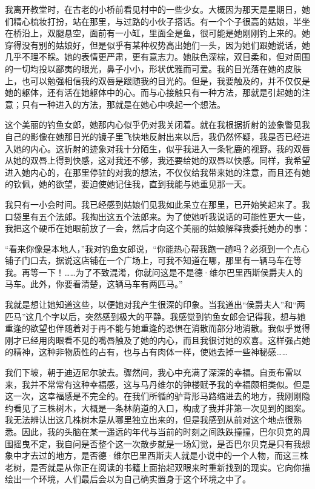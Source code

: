 \par 我离开教堂时，在古老的小桥前看见村中的一些少女。大概因为那天是星期日，她们精心梳妆打扮，站在那里，与过路的小伙子搭话。有一个个子很高的姑娘，半坐在桥沿上，双腿悬空，面前有一小缸，里面全是鱼，很可能是她刚刚钓上来的。她穿得没有别的姑娘好，但是似乎有某种权势高出她们一头，因为她们跟她说话，她几乎不理不睬。她的表情更严肃，更有意志力。她肤色深棕，双目柔和，但对周围的一切均投以鄙夷的眼光，鼻子小小，形状优雅而可爱。我的目光落在她的皮肤上，也可以勉强相信我的双唇是跟随我的目光的。但是，我要触及的，并不仅仅是她的躯体，还有活在她躯体中的心。而与心接触只有一种方法，那就是引起她的注意；只有一种进入的方法，那就是在她心中唤起一个想法。
\par 这个美丽的钓鱼女郎，她那内心似乎仍对我关闭着。就在我根据折射的迹象瞥见我自己的影像在她那目光的镜子里飞快地反射出来以后，我仍然怀疑，我是否已经进入她的内心。这折射的迹象对我十分陌生，似乎我进入一条牝鹿的视野。我的双唇从她的双唇上得到快感，这对我还不够，我还要给她的双唇以快感。同样，我希望进入她内心的，在那里停驻的对我的想法，不仅仅给我带来她的注意，而且还有她的钦佩，她的欲望，要迫使她记住我，直到我能与她重见那一天。
\par 我只有一小会时间。我已经感到姑娘们见我如此呆立在那里，已开始笑起来了。我口袋里有五个法郎。我掏出这五个法郎来。为了使她听我说话的可能性更大一些，我把这个硬币在她眼前放了一会，然后才向这个美丽的姑娘解释我委托她办的事：
\par “看来你像是本地人，”我对钓鱼女郎说，“你能热心帮我跑一趟吗？必须到一个点心铺子门口去，据说这店铺在一个广场上，可我不知道在哪，那里有一辆马车在等我。再等一下！……为了不致混淆，你就问这是不是德·维尔巴里西斯侯爵夫人的马车。此外，你要看清楚，这辆马车有两匹马。”
\par 我就是想让她知道这些，以便她对我产生很深的印象。当我道出“侯爵夫人”和“两匹马”这几个字以后，突然感到极大的平静。我感觉到钓鱼女郎会记得我，想与她重逢的欲望也伴随着对于再不能与她重逢的恐惧在消散而部分地消散。我似乎觉得刚才已经用肉眼看不见的嘴唇触及了她的内心，而且我很讨她的欢喜。这样强占她的精神，这种非物质性的占有，也与占有肉体一样，使她去掉一些神秘感……
\par 我们下坡，朝于迪迈尼尔驶去。骤然间，我心中充满了深深的幸福。自贡布雷以来，我并不常常有这种幸福感，这与马丹维尔的钟楼赋予我的幸福颇相类似。但是这一次，这幸福感是不完全的。在我们所循的驴背形马路缩进去的地方，我刚刚隐约看见了三株树木，大概是一条林荫道的入口，构成了我并非第一次见到的图案。我无法辨认出这几株树木是从哪里独立出来的，但是我感到从前对这个地点很熟悉。因此，我的头脑在某一遥远的年代与当前的时刻之间跌跌撞撞，巴尔贝克的周围摇曳不定，我自问是否整个这一次散步就是一场幻觉，是否巴尔贝克是只有我想象中才去过的地方，是否德·维尔巴里西斯夫人就是小说中的一个人物，而这三株老树，是否就是从你正在阅读的书籍上面抬起双眼来时重新找到的现实。它向你描绘出一个环境，人们最后会以为自己确实置身于这个环境之中了。
